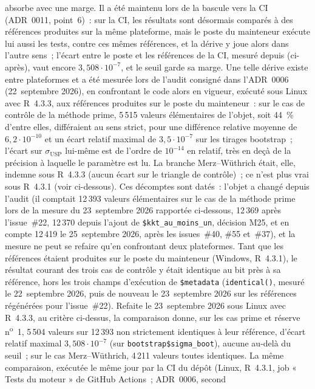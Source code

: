 \documentclass[a4paper,11pt]{article}
\newcommand{\code}[1]{\texttt{\small #1}}
\begin{document}
absorbe avec une marge. Il a été maintenu lors de la bascule vers la CI (ADR~0011, point~6)~:
sur la CI, les résultats sont désormais comparés à des références produites sur la même
plateforme, mais le poste du mainteneur exécute lui aussi les tests, contre ces mêmes
références, et la dérive y joue alors dans l'autre sens~; l'écart entre le poste et les
références de la CI, mesuré depuis (ci-après), vaut encore $3{,}508\cdot 10^{-7}$, et le seuil
garde sa marge. Une telle dérive existe entre plateformes et a été mesurée lors de
l'audit consigné dans l'ADR~0006 (22~septembre 2026), en confrontant le code
alors en vigueur, exécuté sous Linux avec R~4.3.3, aux références produites sur
le poste du mainteneur~: sur le cas de contrôle de la méthode prime, 5\,515
valeurs élémentaires de l'objet, soit 44~\% d'entre elles, différaient au sens
strict, pour une différence relative moyenne de
$6{,}2\cdot 10^{-10}$ et un écart relatif maximal de $3{,}5\cdot 10^{-7}$ sur les
tirages bootstrap~; l'écart sur $\sigma_{\mathrm{USP}}$ lui-même est de l'ordre
de $10^{-14}$ en relatif, très en deçà de la précision à laquelle le paramètre
est lu. La branche Merz--Wüthrich était, elle, indemne sous R~4.3.3 (aucun écart sur le
triangle de contrôle)~; ce n'est plus vrai sous R~4.3.1 (voir ci-dessous). Ces décomptes sont datés~: l'objet a changé depuis l'audit (il
comptait 12\,393 valeurs élémentaires sur le cas de la méthode prime lors de la mesure du
23~septembre 2026 rapportée ci-dessous, 12\,369 après l'issue~\#22, 12\,370
depuis l'ajout de \code{\$kkt\_au\_moins\_un}, décision M25, et en compte 12\,419 le
25~septembre 2026, après les issues~\#40, \#55 et~\#37),
et la mesure ne peut se refaire qu'en confrontant deux plateformes. Tant que les références
étaient produites sur le poste
du mainteneur (Windows, R~4.3.1), le résultat courant des trois cas de contrôle
y était identique au bit près à sa référence, hors les trois champs d'exécution de
\code{\$metadata} (\code{identical()}, mesuré le 22~septembre 2026, puis de nouveau le
23~septembre 2026 sur les références régénérées pour l'issue~\#22). Refaite
le 23~septembre 2026 sous Linux avec R~4.3.3, au critère ci-dessus, la
comparaison donne, sur les cas prime et réserve n\textsuperscript{o}~1,
5\,504 valeurs sur 12\,393 non strictement identiques à leur référence, d'écart
relatif maximal $3{,}508\cdot 10^{-7}$ (sur \code{bootstrap\$sigma\_boot}),
aucune au-delà du seuil~; sur le cas Merz--Wüthrich, 4\,211 valeurs toutes
identiques. La même comparaison, exécutée le même jour par la CI du dépôt (Linux,
R~4.3.1, job « Tests du moteur » de GitHub Actions~; ADR~0006, second
\end{document}
